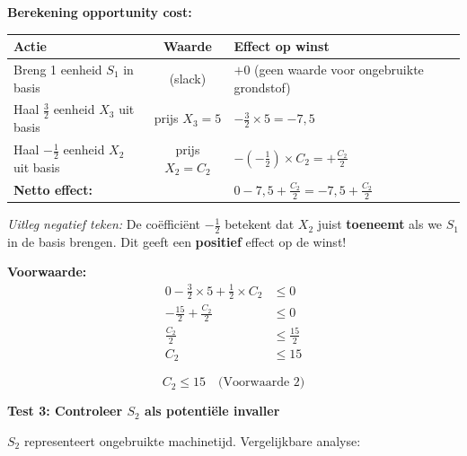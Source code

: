 \documentclass[a4paper,11pt]{article}
\begin{document}
\begin{oefenblok}
    \textbf{Berekening opportunity cost:}

    \begin{center}
        \begin{tabular}{l|c|l}
            \hline
            \textbf{Actie}                              & \textbf{Waarde}                                  & \textbf{Effect op winst}                      \\
            \hline
            Breng 1 eenheid $S_1$ in basis              & (slack)                                          & $+0$ (geen waarde voor ongebruikte grondstof) \\
            Haal $\frac{3}{2}$ eenheid $X_3$ uit basis  & prijs $X_3 = 5$                                  & $-\frac{3}{2} \times 5 = -7{,}5$                \\
            Haal $-\frac{1}{2}$ eenheid $X_2$ uit basis & prijs $X_2 = C_2$                                & $-(-\frac{1}{2}) \times C_2 = +\frac{C_2}{2}$ \\
            \hline
            \multicolumn{2}{l|}{\textbf{Netto effect:}} & $0 - 7{,}5 + \frac{C_2}{2} = -7{,}5 + \frac{C_2}{2}$                                                 \\
            \hline
        \end{tabular}
    \end{center}

    \textit{Uitleg negatief teken:} De coëfficiënt $-\frac{1}{2}$ betekent dat $X_2$ juist \textbf{toeneemt} als we $S_1$ in de basis brengen. Dit geeft een \textbf{positief} effect op de winst!

    \textbf{Voorwaarde:}
    \begin{align*}
        0 - \frac{3}{2} \times 5 + \frac{1}{2} \times C_2 & \leq 0            \\
        -\frac{15}{2} + \frac{C_2}{2}                     & \leq 0            \\
        \frac{C_2}{2}                                     & \leq \frac{15}{2} \\
        C_2                                               & \leq 15
    \end{align*}

    $$\boxed{C_2 \leq 15} \quad \text{(Voorwaarde 2)}$$

    \textbf{Test 3: Controleer $S_2$ als potentiële invaller}

    $S_2$ representeert ongebruikte machinetijd. Vergelijkbare analyse:


\end{oefenblok}
\end{document}
